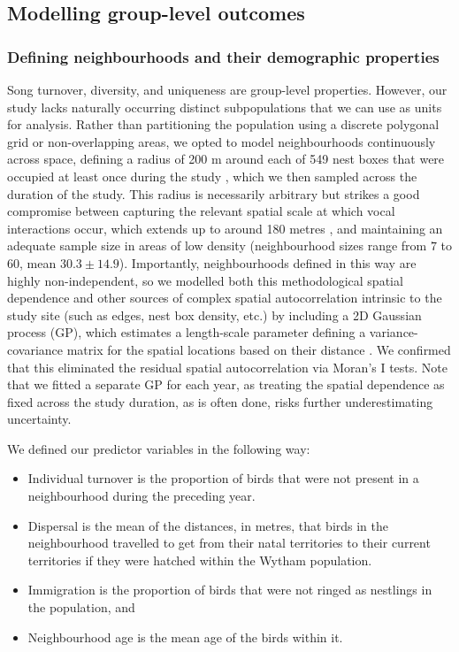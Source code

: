 \documentclass[9pt, onecolumn, twoside, lineno]{gsajnl}
\begin{document}
\subsection{\nmu Modelling group-level outcomes}
\label{sc:group-properties}

\subsubsection{Defining neighbourhoods and their demographic properties}

Song turnover, diversity, and uniqueness are group-level properties. However, our study lacks naturally occurring distinct subpopulations that we can use as units for analysis. Rather than partitioning the population using a discrete polygonal grid or non-overlapping areas, we opted to model neighbourhoods continuously across space, defining a radius of 200 m around each of 549 nest boxes that were occupied at least once during the study \autocite{fayet2014}, which we then sampled across the duration of the study. This radius is necessarily arbitrary but strikes a good compromise between capturing the relevant spatial scale at which vocal interactions occur, which extends up to around 180 metres \autocite{bircher2021, blumenrath2004}, and maintaining an adequate sample size in areas of low density (neighbourhood sizes range from $7$ to $60$, mean $30.3\pm14.9$). Importantly, neighbourhoods defined in this way are highly non-independent, so we modelled both this methodological spatial dependence and other sources of complex spatial autocorrelation intrinsic to the study site (such as edges, nest box density, etc.) by including a 2D Gaussian process (GP), which estimates a length-scale parameter defining a variance-covariance matrix for the spatial locations based on their distance \autocite{dearmon2016, gelfand2016, wright2021}. We confirmed that this eliminated the residual spatial autocorrelation via Moran's I tests. Note that we fitted a separate GP for each year, as treating the spatial dependence as fixed across the study duration, as is often done, risks further underestimating uncertainty.

\noindent
We defined our predictor variables in the following way: 
\begin{itemize}
    \item Individual turnover is the proportion of birds that were not present in a neighbourhood during the preceding year.
    \item Dispersal is the mean of the distances, in metres, that birds in the neighbourhood travelled to get from their natal territories to their current territories if they were hatched within the Wytham population. 
    \item Immigration is the proportion of birds that were not ringed as nestlings in the population, and 
    \item Neighbourhood age is the mean age of the birds within it. 
\end{itemize}
\end{document}
